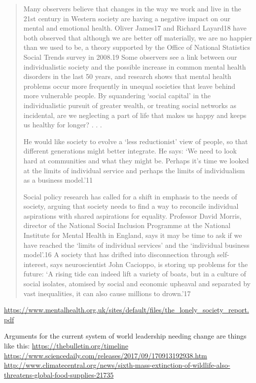 \documentclass[11pt]{article}
\begin{document}
\begin{quote}
Many observers believe that changes in the way we work and live in the 21st century in
Western society are having a negative impact on our mental and emotional health. Oliver
James17 and Richard Layard18 have both observed that although we are better off materially,
we are no happier than we used to be, a theory supported by the Office of National Statistics
Social Trends survey in 2008.19 Some observers see a link between our individualistic society
and the possible increase in common mental health disorders in the last 50 years, and
research shows that mental health problems occur more frequently in unequal societies that
leave behind more vulnerable people. By squandering ‘social capital’ in the individualistic
pursuit of greater wealth, or treating social networks as incidental, are we neglecting a part
of life that makes us happy and keeps us healthy for longer? 
. . . 

He would like society to evolve a ‘less reductionist’ view of people, so that different
generations might better integrate. He says: ‘We need to look hard at communities and what
they might be. Perhaps it’s time we looked at the limits of individual service and perhaps the
limits of individualism as a business model.’11


Social policy research has called for a shift in emphasis to the needs of society, arguing that
society needs to find a way to reconcile individual aspirations with shared aspirations for
equality. Professor David Morris, director of the National Social Inclusion Programme at the
National Institute for Mental Health in England, says it may be time to ask if we have reached
the ‘limits of individual services’ and the ‘individual business model’.16 A society that has
drifted into disconnection through self-interest, says neuroscientist John Cacioppo, is storing
up problems for the future: ‘A rising tide can indeed lift a variety of boats, but in a culture of
social isolates, atomised by social and economic upheaval and separated by vast inequalities,
it can also cause millions to drown.’17
\end{quote}
\url{https://www.mentalhealth.org.uk/sites/default/files/the_lonely_society_report.pdf}

Arguments for the current system of world leadership needing change are things like this: \url{https://thebulletin.org/timeline} \newline \url{https://www.sciencedaily.com/releases/2017/09/170913192938.htm} \newline \url{http://www.climatecentral.org/news/sixth-mass-extinction-of-wildlife-also-threatens-global-food-supplies-21735}
\end{document}
